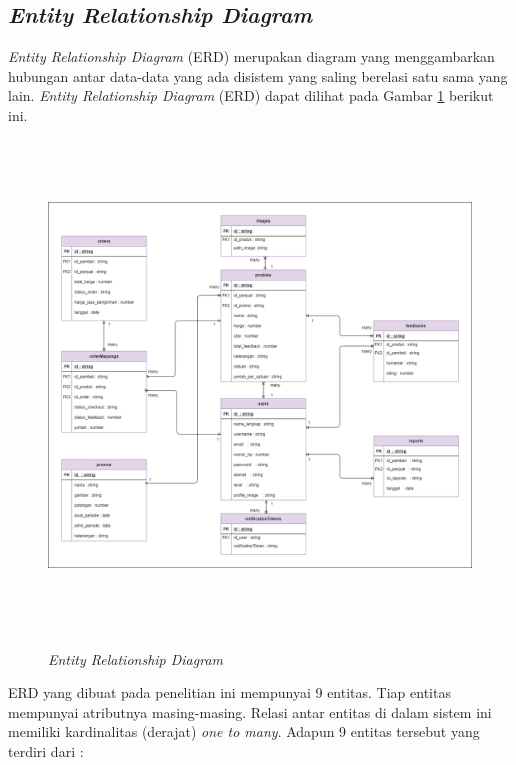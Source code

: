 \subsection{\textit{Entity Relationship Diagram}}
\textit{Entity Relationship Diagram} (ERD) merupakan diagram yang menggambarkan hubungan antar data-data yang ada disistem yang saling berelasi satu sama yang lain. \textit{Entity Relationship Diagram} (ERD) dapat dilihat pada Gambar \ref{erd} berikut ini.
\begin{landscape}
	\begin{figure}[H]
		\centering
		{\includegraphics [width = 22cm, height= 13cm]{gambar/erd}}
		\caption{\textit{Entity Relationship Diagram}}
		\label{erd}
	\end{figure}
\end{landscape}

ERD yang dibuat pada penelitian ini mempunyai 9 entitas. Tiap entitas mempunyai atributnya masing-masing. Relasi antar entitas di dalam sistem ini memiliki kardinalitas (derajat) \textit{one to many}.  Adapun 9 entitas tersebut yang terdiri dari :


